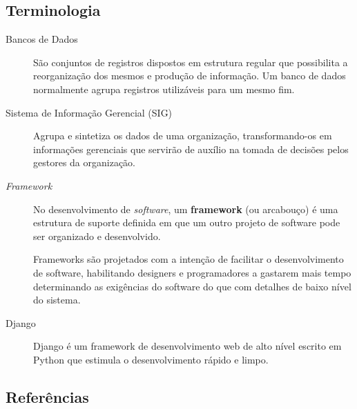 \subsection{Terminologia}
\begin{description}
\item[Bancos de Dados] São conjuntos de registros dispostos em
  estrutura regular que possibilita a reorganização dos mesmos e
  produção de informação. Um banco de dados normalmente agrupa
  registros utilizáveis para um mesmo fim.
\item[Sistema de Informação Gerencial (SIG)] Agrupa e sintetiza os
  dados de uma organização, transformando-os em informações gerenciais
  que servirão de auxílio na tomada de decisões pelos gestores da
  organização.
\item[\textit{Framework}] No desenvolvimento de \textit{software}, um
  \textbf{framework} (ou arcabouço) é uma estrutura de suporte
  definida em que um outro projeto de software pode ser organizado e
  desenvolvido.

  Frameworks são projetados com a intenção de facilitar o
  desenvolvimento de software, habilitando designers e programadores a
  gastarem mais tempo determinando as exigências do software do que
  com detalhes de baixo nível do sistema.
\item[Django] Django é um framework de desenvolvimento web de alto
  nível escrito em Python que estimula o desenvolvimento rápido e
  limpo.
\end{description}

\subsection{Referências}

%
%
